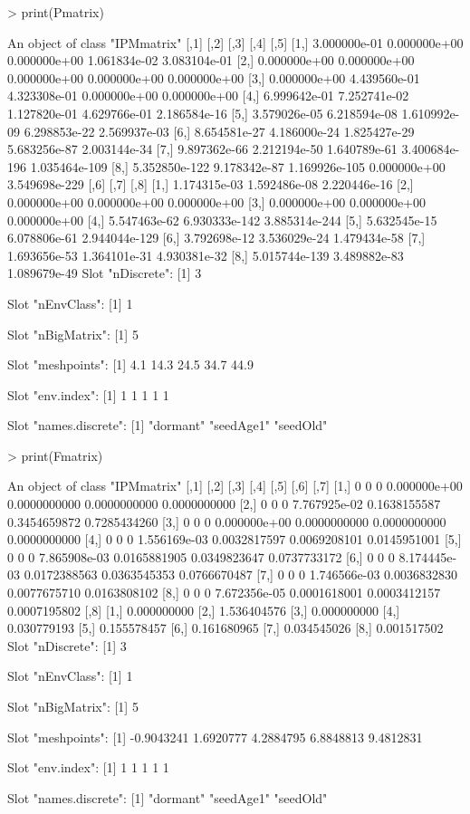 \documentclass{article}
\begin{document}
\begin{Schunk}
\begin{Sinput}
> print(Pmatrix)
\end{Sinput}
\begin{Soutput}
An object of class "IPMmatrix"
              [,1]         [,2]          [,3]          [,4]          [,5]
[1,]  3.000000e-01 0.000000e+00  0.000000e+00  1.061834e-02  3.083104e-01
[2,]  0.000000e+00 0.000000e+00  0.000000e+00  0.000000e+00  0.000000e+00
[3,]  0.000000e+00 4.439560e-01  4.323308e-01  0.000000e+00  0.000000e+00
[4,]  6.999642e-01 7.252741e-02  1.127820e-01  4.629766e-01  2.186584e-16
[5,]  3.579026e-05 6.218594e-08  1.610992e-09  6.298853e-22  2.569937e-03
[6,]  8.654581e-27 4.186000e-24  1.825427e-29  5.683256e-87  2.003144e-34
[7,]  9.897362e-66 2.212194e-50  1.640789e-61 3.400684e-196 1.035464e-109
[8,] 5.352850e-122 9.178342e-87 1.169926e-105  0.000000e+00 3.549698e-229
              [,6]          [,7]          [,8]
[1,]  1.174315e-03  1.592486e-08  2.220446e-16
[2,]  0.000000e+00  0.000000e+00  0.000000e+00
[3,]  0.000000e+00  0.000000e+00  0.000000e+00
[4,]  5.547463e-62 6.930333e-142 3.885314e-244
[5,]  5.632545e-15  6.078806e-61 2.944044e-129
[6,]  3.792698e-12  3.536029e-24  1.479434e-58
[7,]  1.693656e-53  1.364101e-31  4.930381e-32
[8,] 5.015744e-139  3.489882e-83  1.089679e-49
Slot "nDiscrete":
[1] 3

Slot "nEnvClass":
[1] 1

Slot "nBigMatrix":
[1] 5

Slot "meshpoints":
[1]  4.1 14.3 24.5 34.7 44.9

Slot "env.index":
[1] 1 1 1 1 1

Slot "names.discrete":
[1] "dormant"  "seedAge1" "seedOld" 
\end{Soutput}
\begin{Sinput}
> print(Fmatrix)
\end{Sinput}
\begin{Soutput}
An object of class "IPMmatrix"
     [,1] [,2] [,3]         [,4]         [,5]         [,6]         [,7]
[1,]    0    0    0 0.000000e+00 0.0000000000 0.0000000000 0.0000000000
[2,]    0    0    0 7.767925e-02 0.1638155587 0.3454659872 0.7285434260
[3,]    0    0    0 0.000000e+00 0.0000000000 0.0000000000 0.0000000000
[4,]    0    0    0 1.556169e-03 0.0032817597 0.0069208101 0.0145951001
[5,]    0    0    0 7.865908e-03 0.0165881905 0.0349823647 0.0737733172
[6,]    0    0    0 8.174445e-03 0.0172388563 0.0363545353 0.0766670487
[7,]    0    0    0 1.746566e-03 0.0036832830 0.0077675710 0.0163808102
[8,]    0    0    0 7.672356e-05 0.0001618001 0.0003412157 0.0007195802
            [,8]
[1,] 0.000000000
[2,] 1.536404576
[3,] 0.000000000
[4,] 0.030779193
[5,] 0.155578457
[6,] 0.161680965
[7,] 0.034545026
[8,] 0.001517502
Slot "nDiscrete":
[1] 3

Slot "nEnvClass":
[1] 1

Slot "nBigMatrix":
[1] 5

Slot "meshpoints":
[1] -0.9043241  1.6920777  4.2884795  6.8848813  9.4812831

Slot "env.index":
[1] 1 1 1 1 1

Slot "names.discrete":
[1] "dormant"  "seedAge1" "seedOld" 
\end{Soutput}
\end{Schunk}
\end{document}
